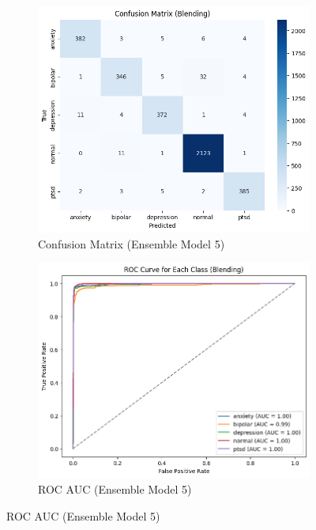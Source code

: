 \begin{figure}[h!]
    \centering
    \begin{subfigure}[b]{0.48\textwidth}
        \centering
        \includegraphics[width=\textwidth]{Images/BLD CM.png}
        \caption*{Confusion Matrix (Ensemble Model 5)}
        \label{bld cm}  %
    \end{subfigure}
    \hfill
    \begin{subfigure}[b]{0.48\textwidth}
        \centering
        \includegraphics[width=\textwidth]{Images/BLD ROC.png}
        \caption*{ROC AUC (Ensemble Model 5)}
        \label{bld roc}  %
    \end{subfigure}
    \label{fig:ensemble_model5_comparison}
\end{figure}


